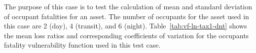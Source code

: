 The purpose of this case is to test the calculation of mean and standard deviation of occupant fatalities for an asset. The number of occupants for the asset used in this case are 2 (day), 4 (transit), and 6 (night). Table~\ref{tab:vf-ln-tax1-dnt} shows the mean loss ratios and corresponding coefficients of variation for the occupants fatality vulnerability function used in this test case.
